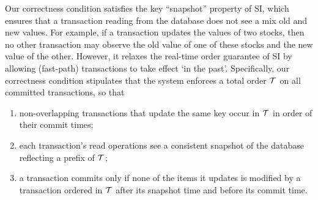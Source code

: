 Our correctness condition satisfies the key ``snapshot'' property of SI, which ensures that a transaction reading from the  database
does not see a mix old and new values. For example, if a transaction updates the values of two stocks, 
then no other transaction may observe the old value of one of these stocks and the new value of the other.
However, it relaxes the real-time order guarantee of SI by allowing (fast-path) transactions to take effect `in the past'.  
Specifically, our correctness condition stipulates that
the system enforces a total order ${\cal T}$ on all committed transactions, so that
\begin{enumerate}
    \setlength{\itemsep}{0pt}
    \setlength{\parskip}{0pt}
    \setlength{\parsep}{2pt}  
\item
non-overlapping transactions 
that update the same key occur in ${\cal T}$  in order of their commit times;
\item
each  transaction's read operations see a consistent snapshot of the database reflecting 
a prefix of  ${\cal T}$; 
\item
 a transaction commits only if none of the items it updates is modified by a transaction ordered in ${\cal T}$ after
 its snapshot time and before its commit time.
 \end{enumerate}

